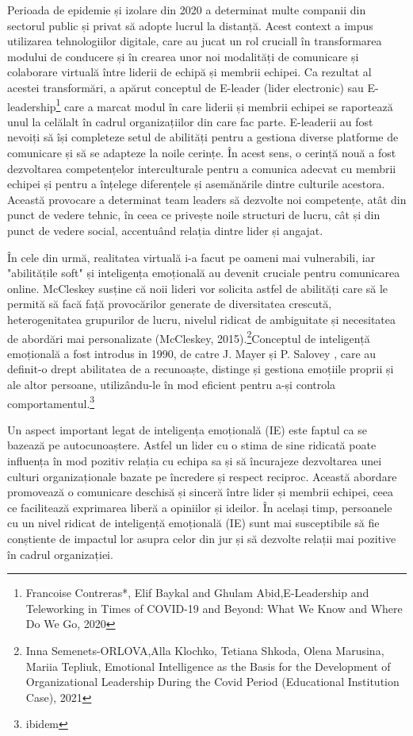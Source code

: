 \documentclass[a4paper, 12pt]{article}
\begin{document}
    \quad\quad Perioada de epidemie și izolare din 2020  a determinat multe companii din sectorul public și privat să adopte lucrul la distanță. Acest context a impus utilizarea tehnologiilor digitale, care au jucat un rol cruciall în transformarea modului de conducere și în crearea unor noi modalități de comunicare și colaborare virtuală între liderii de echipă și membrii echipei. Ca rezultat al acestei transformări, a apărut conceptul de E-leader (lider electronic) sau E-leadership\footnote{Francoise Contreras*, Elif Baykal and Ghulam Abid,E-Leadership and Teleworking in Times of COVID-19 and Beyond: What We Know and Where Do We Go, 2020}
 care a marcat modul în care liderii și membrii echipei se raportează unul la celălalt în cadrul organizațiilor din care fac parte. E-leaderii au fost nevoiți să își completeze setul de abilități pentru a gestiona diverse platforme de comunicare și să se adapteze la noile cerințe. În acest sens, o cerință nouă a fost dezvoltarea competențelor interculturale pentru a comunica adecvat cu membrii echipei și pentru a înțelege diferențele și asemănările dintre culturile acestora. Această provocare a determinat team leaders să dezvolte noi competențe, atât din punct de vedere tehnic, în ceea ce privește noile structuri de lucru, cât și din punct de vedere social, accentuând relația dintre lider și angajat.

	\quad În cele din urmă,  realitatea virtuală i-a facut pe oameni mai vulnerabili, iar "abilitățile soft" și inteligența emoțională au devenit cruciale pentru comunicarea online. McCleskey susține că noii lideri vor solicita astfel de abilități care să le permită să facă față provocărilor generate de diversitatea crescută, heterogenitatea grupurilor de lucru, nivelul ridicat de ambiguitate și necesitatea de abordări mai personalizate (McCleskey, 2015).\footnote { Inna Semenets-ORLOVA,Alla Klochko, Tetiana Shkoda, Olena Marusina, Mariia Tepliuk, Emotional Intelligence as the Basis for the Development of Organizational Leadership During the Covid Period (Educational Institution Case), 2021}Conceptul de inteligență emoțională a fost introdus in 1990, de catre J. Mayer și P. Salovey , care au definit-o drept abilitatea de a recunoaște, distinge și gestiona emoțiile proprii și ale altor persoane, utilizându-le în mod eficient pentru a-și controla comportamentul.\footnote{ibidem} 

	\quad\quad Un aspect important legat de inteligența emoțională (IE) este faptul ca se bazează pe autocunoaștere. Astfel un lider cu o stima de sine ridicată poate influența în mod pozitiv relația cu echipa sa și să încurajeze dezvoltarea unei culturi organizaționale bazate pe încredere și respect reciproc. Această abordare promovează o comunicare deschisă și sinceră între lider și membrii echipei, ceea ce facilitează exprimarea liberă a opiniilor și ideilor. În același timp, persoanele cu un nivel ridicat de inteligență emoțională (IE) sunt mai susceptibile să fie conștiente de impactul lor asupra celor din jur și să dezvolte relații mai pozitive în cadrul organizației.
\end{document}
